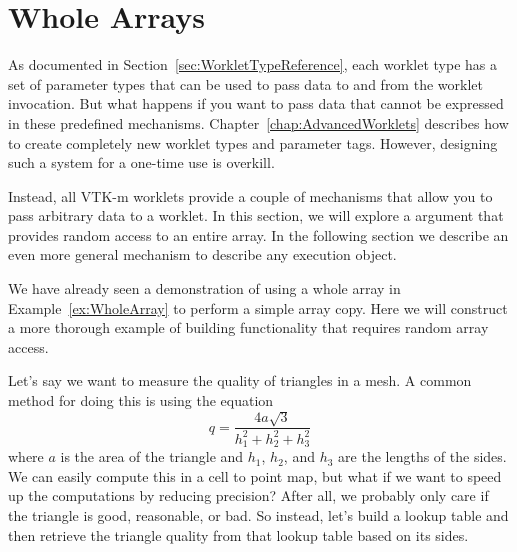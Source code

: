 








\section{Whole Arrays}
\label{sec:WholeArrays}


As documented in Section~\ref{sec:WorkletTypeReference}, each worklet type
has a set of parameter types that can be used to pass data to and from the
worklet invocation. But what happens if you want to pass data that cannot
be expressed in these predefined mechanisms.
Chapter~\ref{chap:AdvancedWorklets} describes how to create completely new
worklet types and parameter tags. However, designing such a system for a
one-time use is overkill.

Instead, all VTK-m worklets provide a couple of mechanisms that allow you
to pass arbitrary data to a worklet. In this section, we will explore a
 argument that provides random access to an entire
array. In the following section we describe an even more general mechanism
to describe any execution object.

We have already seen a demonstration of using a whole array in
Example~\ref{ex:WholeArray} to perform a simple array copy. Here we will
construct a more thorough example of building functionality that requires
random array access.

Let's say we want to measure the quality of triangles in a mesh. A
common method for doing this is using the equation
\begin{equation*}
  q = \frac{4a\sqrt{3}}{h_1^2 + h_2^2 + h_3^2}
\end{equation*}
where $a$ is the area of the triangle and $h_1$, $h_2$, and $h_3$ are the
lengths of the sides. We can easily compute this in a cell to point map,
but what if we want to speed up the computations by reducing precision?
After all, we probably only care if the triangle is good, reasonable, or
bad. So instead, let's build a lookup table and then retrieve the triangle
quality from that lookup table based on its sides.

